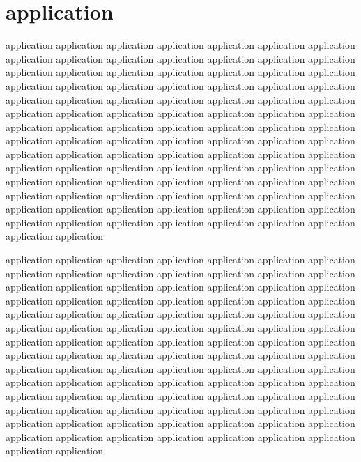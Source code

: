 \documentclass[platex,ja=standard,12pt,a4paper,twoside,onecolumn,fleqn,dvipdfmx,english]{bxjsbook}
\begin{document}
\chapter{application}
application application application application application application application application application application application application application application application application application application application application application application application application application application application application application application application application application application application application application application application application application application application application application application application application application application application application application application application application application application application application application application application application application application application application application application application application application application application application application application application application application application application application application application application application application application application application application application application application application application application application

application application application application application application application application application application application application application application application application application application application application application application application application application application application application application application application application application application application application application application application application application application application application application application application application application application application application application application application application application application application application application application application application application application application application application application application application application application application application application application application application application application application application application application application application application application application application application application application application application application application application
\end{document}
